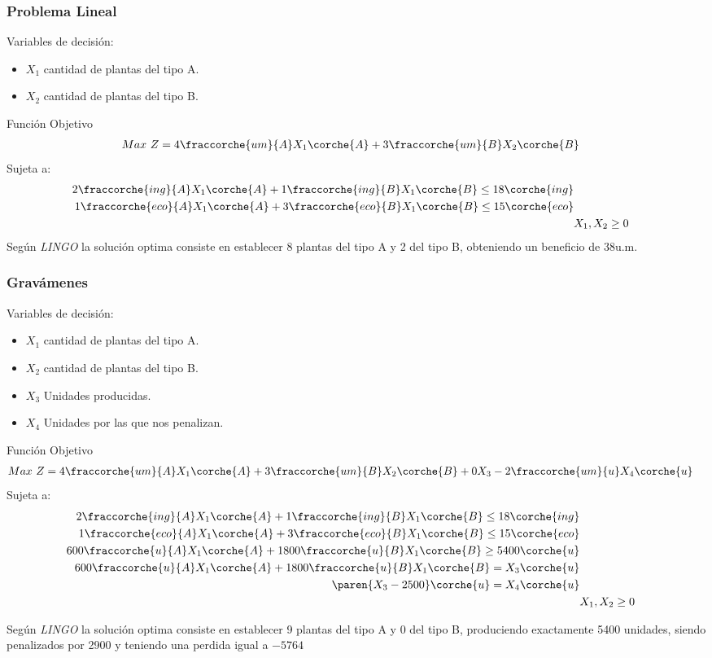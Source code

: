 

\begin{homeworkProblem}[-1][Compañía]
\subsubsection{Problema Lineal}
Variables de decisión:
\begin{itemize}
    \item $X_1$ cantidad de plantas del tipo A.
    \item $X_2$ cantidad de plantas del tipo B.
\end{itemize}
Función Objetivo
\begin{align*}
   Max\ Z = 4\fraccorche{um}{A}&X_1\corche{A} + 3\fraccorche{um}{B}X_2\corche{B} 
\end{align*}
Sujeta a:
\begin{align*}
    2\fraccorche{ing}{A}X_1\corche{A} + 1\fraccorche{ing}{B}X_1\corche{B} \leq 18\corche{ing} \\
    1\fraccorche{eco}{A}X_1\corche{A} + 3\fraccorche{eco}{B}X_1\corche{B} \leq 15\corche{eco} \\
    &X_1,X_2\geq 0
\end{align*}
Según \textit{LINGO} la solución optima consiste en establecer 8 plantas del tipo A y 2 del tipo B, obteniendo un beneficio de 38u.m.


\subsubsection{Gravámenes}
Variables de decisión:
\begin{itemize}
    \item $X_1$ cantidad de plantas del tipo A.
    \item $X_2$ cantidad de plantas del tipo B.
    \item $X_3$ Unidades producidas.
    \item $X_4$ Unidades por las que nos penalizan.
\end{itemize}
Función Objetivo
\begin{align*}
   Max\ Z = 4\fraccorche{um}{A}&X_1\corche{A} + 3\fraccorche{um}{B}X_2\corche{B} + 0X_3 - 2\fraccorche{um}{u}X_4\corche{u}
\end{align*}
Sujeta a:
\begin{align*}
    2\fraccorche{ing}{A}X_1\corche{A} + 1\fraccorche{ing}{B}X_1\corche{B} \leq 18\corche{ing} \\
    1\fraccorche{eco}{A}X_1\corche{A} + 3\fraccorche{eco}{B}X_1\corche{B} \leq 15\corche{eco} \\
    600\fraccorche{u}{A}X_1\corche{A} + 1800\fraccorche{u}{B}X_1\corche{B} \geq 5400\corche{u} \\
    600\fraccorche{u}{A}X_1\corche{A} + 1800\fraccorche{u}{B}X_1\corche{B} = X_3\corche{u} \\
    \paren{X_3 - 2500}\corche{u} = X_4\corche{u} \\
    &X_1,X_2\geq 0
\end{align*}

Según \textit{LINGO} la solución optima consiste en establecer 9 plantas del tipo A y 0 del tipo B, produciendo exactamente 5400 unidades, siendo penalizados por 2900 y teniendo una perdida igual a $-5764$

\end{homeworkProblem}


